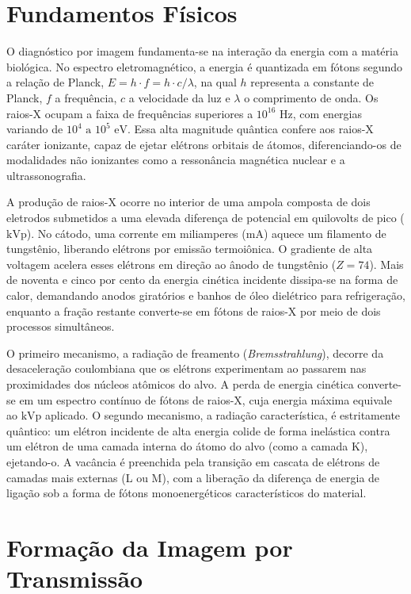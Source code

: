 \documentclass[a4paper,12pt,oneside,openright]{abntex2}
\begin{document}
\section{Fundamentos Físicos}

O diagnóstico por imagem fundamenta-se na interação da energia com a matéria biológica. No espectro eletromagnético, a energia é quantizada em fótons segundo a relação de Planck, $E = h \cdot f = h \cdot c / \lambda$, na qual $h$ representa a constante de Planck, $f$ a frequência, $c$ a velocidade da luz e $\lambda$ o comprimento de onda. Os raios-X ocupam a faixa de frequências superiores a $10^{16}\text{ Hz}$, com energias variando de $10^4\text{ a }10^5\text{ eV}$. Essa alta magnitude quântica confere aos raios-X caráter ionizante, capaz de ejetar elétrons orbitais de átomos, diferenciando-os de modalidades não ionizantes como a ressonância magnética nuclear e a ultrassonografia.

A produção de raios-X ocorre no interior de uma ampola composta de dois eletrodos submetidos a uma elevada diferença de potencial em quilovolts de pico ($\text{kVp}$). No cátodo, uma corrente em miliamperes ($\text{mA}$) aquece um filamento de tungstênio, liberando elétrons por emissão termoiônica. O gradiente de alta voltagem acelera esses elétrons em direção ao ânodo de tungstênio ($Z = 74$). Mais de noventa e cinco por cento da energia cinética incidente dissipa-se na forma de calor, demandando anodos giratórios e banhos de óleo dielétrico para refrigeração, enquanto a fração restante converte-se em fótons de raios-X por meio de dois processos simultâneos.

O primeiro mecanismo, a radiação de freamento (\textit{Bremsstrahlung}), decorre da desaceleração coulombiana que os elétrons experimentam ao passarem nas proximidades dos núcleos atômicos do alvo. A perda de energia cinética converte-se em um espectro contínuo de fótons de raios-X, cuja energia máxima equivale ao $\text{kVp}$ aplicado. O segundo mecanismo, a radiação característica, é estritamente quântico: um elétron incidente de alta energia colide de forma inelástica contra um elétron de uma camada interna do átomo do alvo (como a camada K), ejetando-o. A vacância é preenchida pela transição em cascata de elétrons de camadas mais externas (L ou M), com a liberação da diferença de energia de ligação sob a forma de fótons monoenergéticos característicos do material.

\section{Formação da Imagem por Transmissão}
\end{document}

